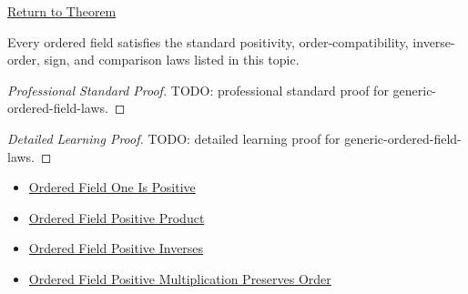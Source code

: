 \newpage
{}
\label{prf:generic-ordered-field-laws}

\begin{remark*}[Return]
\hyperref[cor:generic-ordered-field-laws]{Return to Theorem}
\end{remark*}

\begin{corollary*}
Every ordered field satisfies the standard positivity, order-compatibility,
inverse-order, sign, and comparison laws listed in this topic.
\end{corollary*}

\begin{proof}[Professional Standard Proof]
\LRAProofBodyStart
TODO: professional standard proof for generic-ordered-field-laws.
\end{proof}

\begin{proof}[Detailed Learning Proof]
\LRAProofBodyStart
TODO: detailed learning proof for generic-ordered-field-laws.
\end{proof}

\begin{remark*}
\end{remark*}

\begin{dependencies}
\begin{itemize}
  \item \hyperref[def:one-in-q]{Ordered Field One Is Positive}
  \item \hyperref[thm:ordered-field-positive-product]{Ordered Field Positive Product}
  \item \hyperref[thm:reciprocal-reverses-order-on-positives-q]{Ordered Field Positive Inverses}
  \item \hyperref[thm:ordered-field-positive-multiplication-preserves-order]{Ordered Field Positive Multiplication Preserves Order}
\end{itemize}
\end{dependencies}

\clearpage
